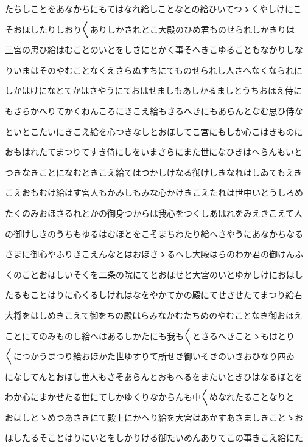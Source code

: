 \documentclass[a4paper,11pt,landscape]{ltjtarticle}
\begin{document}
たちしことをあなかちにもてはなれ給しことなとの給ひいてつゝくやしけにこ
\par\medskip
そおほしたりしおり〱ありしかされとこ大殿のひめ君ものせられしかきりは
\par\medskip
三宮の思ひ給はむことのいとをしさにとかく事そへきこゆることもなかりしな
\par\medskip
りいまはそのやむことなくえさらぬすちにてものせられし人さへなくなられに
\par\medskip
しかはけになとてかはさやうにておはせましもあしかるましとうちおほえ侍に
\par\medskip
もさらかへりてかくねんころにきこえ給もさるへきにもあらんとなむ思ひ侍な
\par\medskip
といとこたいにきこえ給を心つきなしとおほしてこ宮にもしか心こはきものに
\par\medskip
おもはれたてまつりてすき侍にしをいまさらにまた世になひきはへらんもいと
\par\medskip
つきなきことになむときこえ給てはつかしけなる御けしきなれはしゐてもえき
\par\medskip
こえおもむけ給はす宮人もかみしもみな心かけきこえたれは世中いとうしろめ
\par\medskip
たくのみおほさるれとかの御身つからは我心をつくしあはれをみえきこえて人
\par\medskip
の御けしきのうちもゆるはむほとをこそまちわたり給へさやうにあなかちなる
\par\medskip
さまに御心やふりきこえんなとはおほさゝるへし大殿はらのわか君の御けんふ
\par\medskip
くのことおほしいそくを二条の院にてとおほせと大宮のいとゆかしけにおほし
\par\medskip
たるもことはりに心くるしけれはなをやかてかの殿にてせさせたてまつり給右
\par\medskip
大将をはしめきこえて御をちの殿はらみなかむたちめのやむことなき御おほえ
\par\medskip
ことにてのみものし給へはあるしかたにも我も〱とさるへきことゝもはとり
\par\medskip
〱につかうまつり給おほかた世ゆすりて所せき御いそきのいきおひなり四ゐ
\par\medskip
になしてんとおほし世人もさそあらんとおもへるをまたいときひはなるほとを
\par\medskip
わか心にまかせたる世にてしかゆくりなからんも中〱めなれたることなりと
\par\medskip
おほしとゝめつあさきにて殿上にかへり給を大宮はあかすあさましきことゝお
\par\medskip
ほしたるそことはりにいとをしかりける御たいめんありてこの事きこえ給にた
\end{document}
